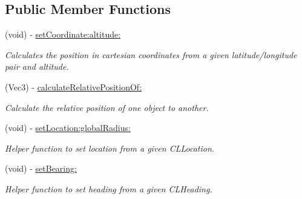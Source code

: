 \subsection*{\-Public \-Member \-Functions}
\begin{DoxyCompactItemize}
\item 
\hypertarget{interface_a_r_world_location_a602a1aa29f7aa4403091ffae9eaa76ba}{
(void) -\/ \hyperlink{interface_a_r_world_location_a602a1aa29f7aa4403091ffae9eaa76ba}{set\-Coordinate\-:altitude\-:}}
\label{interface_a_r_world_location_a602a1aa29f7aa4403091ffae9eaa76ba}

\begin{DoxyCompactList}\small\item\em \-Calculates the position in cartesian coordinates from a given latitude/longitude pair and altitude. \end{DoxyCompactList}\item 
(\-Vec3) -\/ \hyperlink{interface_a_r_world_location_a3e62f3cc4265c32e4044aa0ac161679a}{calculate\-Relative\-Position\-Of\-:}
\begin{DoxyCompactList}\small\item\em \-Calculate the relative position of one object to another. \end{DoxyCompactList}\item 
\hypertarget{interface_a_r_world_location_a16a712dce023f2813ac41696ec5fc441}{
(void) -\/ \hyperlink{interface_a_r_world_location_a16a712dce023f2813ac41696ec5fc441}{set\-Location\-:global\-Radius\-:}}
\label{interface_a_r_world_location_a16a712dce023f2813ac41696ec5fc441}

\begin{DoxyCompactList}\small\item\em \-Helper function to set location from a given \-C\-L\-Location. \end{DoxyCompactList}\item 
\hypertarget{interface_a_r_world_location_a31c6edb0dc4a98b788045f924ab99c37}{
(void) -\/ \hyperlink{interface_a_r_world_location_a31c6edb0dc4a98b788045f924ab99c37}{set\-Bearing\-:}}
\label{interface_a_r_world_location_a31c6edb0dc4a98b788045f924ab99c37}

\begin{DoxyCompactList}\small\item\em \-Helper function to set heading from a given \-C\-L\-Heading. \end{DoxyCompactList}\end{DoxyCompactItemize}
